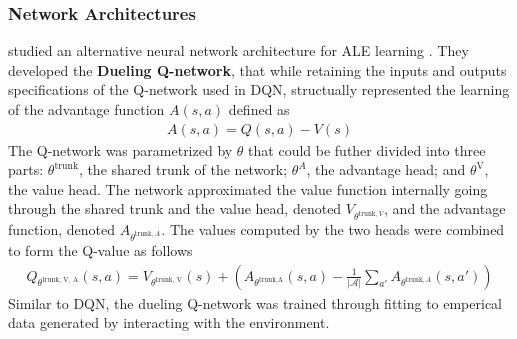 \subsubsection{Network Architectures}
\citeauthor{DuelingNetworkArchitectures_Wang.Schaul.ea_} studied an alternative neural network architecture for ALE learning \cite{DuelingNetworkArchitectures_Wang.Schaul.ea_}.
They developed the \textbf{Dueling Q-network}, that while retaining the inputs and outputs specifications of the Q-network used in DQN, structually represented the learning of the advantage function $A(s, a)$ defined as
\begin{align*}
    A(s, a) = Q(s, a) - V(s)
\end{align*}
The Q-network was parametrized by $\theta$ that could be futher divided into three parts:
$\theta^\text{trunk}$, the shared trunk of the network; $\theta^A$, the advantage head; and $\theta^\text{V}$, the value head.
The network approximated the value function internally going through the shared trunk and the value head, denoted $V_{\theta^{\text{trunk}, V}}$, and the advantage function, denoted $A_{\theta^{\text{trunk}, A}}$.
The values computed by the two heads were combined to form the Q-value as follows
\begin{align*}
    Q_{\theta^{\text{trunk, V, A}}}(s, a)
    = V_{\theta^{\text{trunk, V}}}(s)
    + \left( A_{\theta^{\text{trunk,A}}}(s, a)
    - \frac{1}{| \mathcal{A} | } \sum_{a'}A_{\theta^{\text{trunk},A}}(s, a') \right)
\end{align*}
Similar to DQN, the dueling Q-network was trained through fitting to emperical data generated by interacting with the environment.

